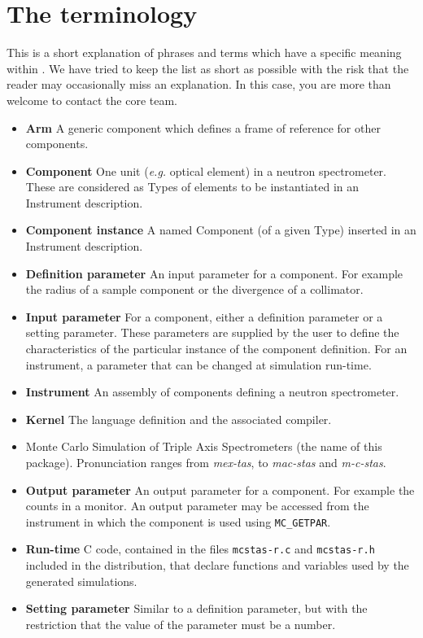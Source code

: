 
\chapter{The \MCS terminology}
\label{s:terminology}

This is a short explanation of phrases and terms which have a specific
meaning within \MCS. We have tried to keep the list as short
as possible with the risk that the reader may occasionally miss
an explanation. In this case, you are more than welcome to contact
the \MCS core team.

\noindent
\begin{itemize}
\item\textbf{Arm}  A generic \MCS component which defines a frame of reference
      for other components.
\item\textbf{Component} One unit ({\em e.g.} optical element) in a neutron
      spectrometer. These are considered as Types of elements to be instantiated in an Instrument description.
\item\textbf{Component instance} A named Component (of a given Type) inserted in an Instrument description.
\item\textbf{Definition parameter} An input parameter for a component. For
  example the radius of a sample component or the divergence of a collimator.
\item\textbf{Input parameter} For a component, either a definition parameter
or a setting parameter. These parameters are supplied by the user to
define the characteristics of the particular instance of the component
definition. For an instrument, a parameter that can be changed at
simulation run-time.
\item\textbf{Instrument} An assembly of \MCS components defining
      a neutron spectrometer.
\item\textbf{Kernel} The \MCS language definition and the associated compiler.
\item\textbf{\MCS} Monte Carlo Simulation of Triple Axis Spectrometers
       (the name of this package).
  Pronunciation ranges from \emph{mex-tas}, to \emph{mac-stas} and \emph{m-c-stas}.
\item\textbf{Output parameter} An output parameter for a component.
  For example the counts in a monitor. An output parameter may be
  accessed from the instrument in which the component is used using
  \verb`MC_GETPAR`.
\item\textbf{Run-time} C code, contained in the files
  \verb+mcstas-r.c+ and \verb+mcstas-r.h+ included in the \MCS
  distribution, that declare functions and variables used by the
  generated simulations.
\item\textbf{Setting parameter} Similar to a definition parameter, but with the
  restriction that the value of the parameter must be a number.
\end{itemize}
